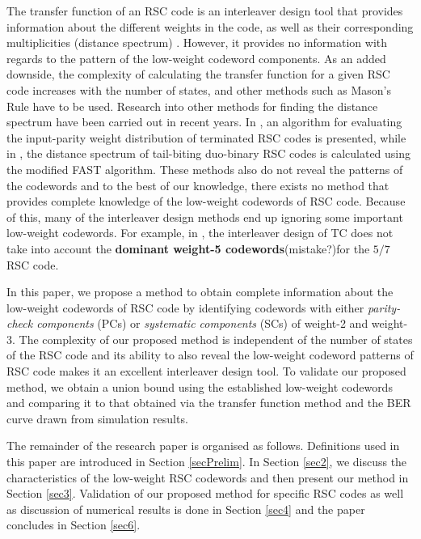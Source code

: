 The transfer function of an RSC code is an interleaver design tool that provides information about the different weights in the code, as well as their corresponding multiplicities (distance spectrum) \cite{Benedetto96-05J}. 
However, it provides no information with regards to the pattern of the low-weight codeword components. As an added downside, the complexity of calculating the transfer function for a given RSC code increases with the number of states, and other methods such as Mason's Rule \cite{Moon05B} have to be used. Research into other methods for finding the distance spectrum have been carried out in recent years.  In \cite{Lu16-10C}, an algorithm for evaluating the input-parity weight distribution of
terminated RSC codes is presented, while in \cite{Deng17-01C}, the distance spectrum of tail-biting duo-binary
RSC codes is calculated using the modified FAST algorithm. These methods also do not reveal the patterns of the codewords and to the best of our knowledge, there exists no method that provides complete knowledge of the low-weight codewords of RSC code. Because of this, many of the interleaver design methods end up ignoring some important low-weight codewords. For example, in \cite{Sun05-01J}, the interleaver design of TC does not take into account the \textbf{dominant weight-5 codewords}(mistake?)for the $5/7$  RSC code.

In this paper, we propose a method to obtain complete information about the low-weight codewords of RSC code by identifying codewords with either {\it parity-check components} (PCs) or {\it systematic components} (SCs) of weight-2 and weight-3. The complexity of our proposed method is independent of the number of states of the RSC code and its ability to also reveal the low-weight codeword patterns of RSC code makes it an excellent interleaver design tool.
To validate our proposed method, we obtain a union bound using the established low-weight codewords and comparing it to that obtained via the transfer function method and the BER curve drawn from simulation results.

The remainder of the research paper is organised as follows. Definitions used in this paper are introduced in Section \ref{secPrelim}. In Section \ref{sec2}, we discuss the characteristics of the low-weight RSC codewords and then present our method in Section \ref{sec3}. Validation of our proposed method for specific RSC codes as well as discussion of numerical results is done in Section \ref{sec4} and the paper concludes in Section \ref{sec6}.


